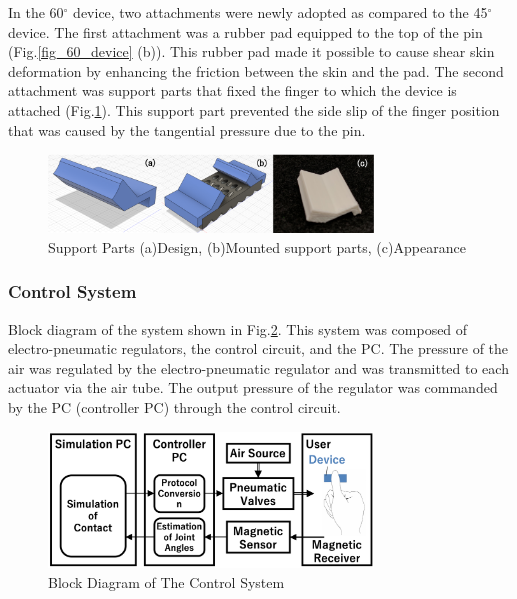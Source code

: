 
In the 60$^{\circ}$ device, two attachments were newly adopted as compared to the 45$^{\circ}$ device.
The first attachment was a rubber pad equipped to the top of the pin (Fig.\ref{fig_60_device} (b)).
This rubber pad made it possible to cause shear skin deformation by enhancing the friction between the skin and the pad. 
The second attachment was support parts that fixed the finger to which the device is attached (Fig.\ref{fig_support_parts}).
This support part prevented the side slip of the finger position that was caused by the tangential pressure due to the pin. 

\begin{figure}[h]
  \centering
  \includegraphics[width=3.4in]{images/fig_support_parts.png}
  \caption{Support Parts
(a)Design, (b)Mounted support parts, (c)Appearance}
  \label{fig_support_parts}
\end{figure}

\subsubsection{Control System}

Block diagram of the system shown in Fig.\ref{fig_block_diagram}.
This system was composed of electro-pneumatic regulators, the control circuit, and the PC. The pressure of the air was regulated by the electro-pneumatic regulator and was transmitted to each actuator via the air tube. 
The output pressure of the regulator was commanded by the PC (controller PC) through the control circuit.

\begin{figure}[h]
  \centering
  \includegraphics[width=3.4in]{images/fig_block_diagram.png}
  \caption{Block Diagram of The Control System}
  \label{fig_block_diagram}
\end{figure}